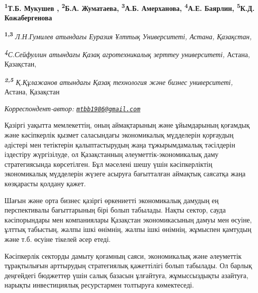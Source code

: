 
\begin{articleheader}

{\bfseries
\textsuperscript{1}Т.Б. Мукушев\textsuperscript{\envelope } ,
\textsuperscript{2}Б.А. Жуматаева,
\textsuperscript{3}А.Б. Амерханова,
\textsuperscript{4}А.Е. Баярлин,
\textsuperscript{5}К.Д. Кожабергенова}
\end{articleheader}

\begin{affiliation}
{\bfseries \textsuperscript{1,3}} \emph{Л.Н.Гумилев атындағы Еуразия Ұлттық Университеті, Астана, Қазақстан,}

\emph{{\bfseries \textsuperscript{4}}С.Сейфуллин атындағы Қазақ агротехникалық зерттеу университеті,} Астана, Қазақстан,

\emph{{\bfseries \textsuperscript{2,5}} Қ.Құлажанов атындағы Қазақ технология және бизнес университеті,} Астана, Қазақстан

\raggedright \textsuperscript{\envelope }{\em Корреспондент-автор: \href{mailto:mtbb1986@gmail.com}{\nolinkurl{mtbb1986@gmail.com}}}
\end{affiliation}

Қазіргі уақытта мемлекеттің, оның аймақтарының және ұйымдарының қоғамдық
және кәсіпкерлік қызмет саласындағы экономикалық мүдделерін қорғаудың
әдістері мен тетіктерін қалыптастырудың жаңа тұжырымдамалық тәсілдерін
іздестіру жүргізілуде, ол Қазақстанның әлеуметтік-экономикалық даму
стратегиясында көрсетілген. Бұл мәселені шешу үшін кәсіпкерліктің
экономикалық мүдделерін жүзеге асыруға бағытталған аймақтық саясатқа
жаңа көзқарасты қолдану қажет.

Шағын және орта бизнес қазіргі өркениетті экономикалық дамудың ең
перспективалы бағыттарының бірі болып табылады. Нақты сектор, сауда
кәсіпорындары мен компаниялары Қазақстан экономикасының дамуы мен
өсуіне, ұлттық табыстың, жалпы ішкі өнімнің, жалпы ішкі өнімнің,
жұмыспен қамтудың және т.б. өсуіне тікелей әсер етеді.

Кәсіпкерлік секторды дамыту қоғамның саяси, экономикалық және әлеуметтік
тұрақтылығын арттырудың стратегиялық қажеттілігі болып табылады. Ол
барлық деңгейдегі бюджеттер үшін салық базасын ұлғайтуға, жұмыссыздықты
азайтуға, нарықты инвестициялық ресурстармен толтыруға көмектеседі.

